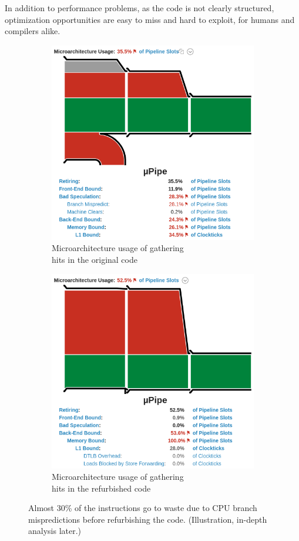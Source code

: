 \documentclass[12pt]{article}
\begin{document}
In addition to performance problems, as the code is not clearly structured, optimization opportunities are easy to miss and hard to exploit, for humans and compilers alike.

\begin{figure}[H]
	\centering
	\begin{subfigure}{.5\textwidth}
		\centering
		\includegraphics[width=.7\linewidth]{velout_gatherhits_orig_uarch}
		\caption{Microarchitecture usage of gathering\\ hits in the original code}
		\label{fig:sub1}
	\end{subfigure}%
	\begin{subfigure}{.5\textwidth}
		\centering
		\includegraphics[width=.7\linewidth]{velout_gatherhits_new_uarch}
		\caption{Microarchitecture usage of gathering\\ hits in the refurbished code}
		\label{fig:sub2}
	\end{subfigure}
	\caption{Almost 30\% of the instructions go to waste due to CPU branch mispredictions before refurbishing the code. (Illustration, in-depth analysis later.)}
	\label{fig_velout_branch_example}
\end{figure}
\end{document}
